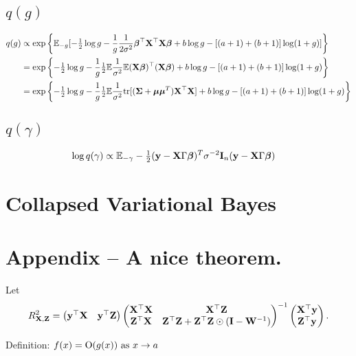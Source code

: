 \documentclass{amsart}[12pt]
\begin{document}
\subsection{$q(g)$}
\begin{align*}
q(g) &\propto \exp \left\{ \mathbb{E}_{-g} [-\tfrac{1}{2} \log g - \frac{1}{g} \frac{1}{2 \sigma^2} {\boldsymbol \beta}^\top {\bf X}^\top {\bf X} {\boldsymbol\beta} + b \log g - [(a + 1) + (b + 1)] \log(1 + g)] \right\} \\
&= \exp \left\{ -\tfrac{1}{2} \log g - \frac{1}{g} \tfrac{1}{2} \mathbb{E} \frac{1}{\sigma^2} \mathbb{E} ({\bf X} {\boldsymbol \beta})^\top ({\bf X} {\boldsymbol \beta}) + b \log g - [(a + 1) + (b + 1)] \log(1 + g) \right\} \\
&= \exp \left\{ -\tfrac{1}{2} \log g - \frac{1}{g} \tfrac{1}{2} \mathbb{E} \frac{1}{\sigma^2} \text{tr}[({\boldsymbol \Sigma} + {\boldsymbol \mu} {\boldsymbol \mu}^T) {\bf X}^\top {\bf X}] + b \log g - [(a + 1) + (b + 1)] \log(1 + g) \right\} \\
\end{align*}

\subsection{$q(\gamma)$}
\begin{align*}
\log q(\gamma) &\propto \mathbb{E}_{-\gamma} -\tfrac{1}{2} ({\bf y} - {\bf X} \Gamma {\boldsymbol\beta})^T \sigma^{-2} {\bf I}_n ({\bf y} - {\bf X} \Gamma {\boldsymbol\beta})
\end{align*}

\section{Collapsed Variational Bayes}


\section{Appendix -- A nice theorem.}
Let
\begin{equation*}
R^2_{{\bf X}, {\bf Z}} = 
\begin{pmatrix}
{\bf y}^\top {\bf X} & {\bf y}^\top {\bf Z}
\end{pmatrix}
\begin{pmatrix}
{\bf X}^\top {\bf X} & {\bf X}^\top {\bf Z} \\
{\bf Z}^\top {\bf X} & {\bf Z}^\top {\bf Z} + {\bf Z}^\top {\bf Z} \odot ({\bf I} - {\bf W}^{-1})
\end{pmatrix}^{-1}
\begin{pmatrix}
{\bf X}^\top {\bf y}\\
{\bf Z}^\top {\bf y}
\end{pmatrix}.
\end{equation*}

Definition:
$f(x) = \text{O}(g(x)) \text{ as } x \to a$
\end{document}
